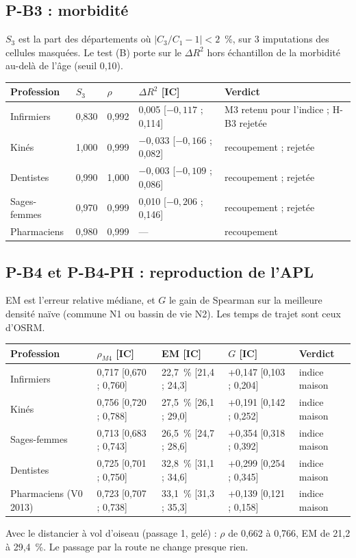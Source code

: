 \documentclass[11pt]{article}
\begin{document}
\subsection{P-B3 : morbidité}
$S_3$ est la part des départements où $|C_3/C_1-1|<2$~\%, sur 3 imputations des cellules masquées. Le test (B) porte
sur le $\Delta R^2$ hors échantillon de la morbidité au-delà de l'âge (seuil 0,10).
\begin{center}\footnotesize
\begin{tabular}{@{}lllll@{}}
\toprule
Profession & $S_3$ & $\rho$ & $\Delta R^2$ [IC] & Verdict \\
\midrule
Infirmiers & 0,830 & 0,992 & 0,005 [$-0{,}117$ ; 0,114] & M3 retenu pour l'indice ; H-B3 rejetée \\
Kinés & 1,000 & 0,999 & $-0{,}033$ [$-0{,}166$ ; 0,082] & recoupement ; rejetée \\
Dentistes & 0,990 & 1,000 & $-0{,}003$ [$-0{,}109$ ; 0,086] & recoupement ; rejetée \\
Sages-femmes & 0,970 & 0,999 & 0,010 [$-0{,}206$ ; 0,146] & recoupement ; rejetée \\
Pharmaciens & 0,980 & 0,999 & --- & recoupement \\
\bottomrule
\end{tabular}
\end{center}

\subsection{P-B4 et P-B4-PH : reproduction de l'APL}
EM est l'erreur relative médiane, et $G$ le gain de Spearman sur la meilleure densité naïve (commune N1 ou bassin de
vie N2). Les temps de trajet sont ceux d'OSRM.
\begin{center}\footnotesize
\begin{tabular}{@{}lllll@{}}
\toprule
Profession & $\rho_{M4}$ [IC] & EM [IC] & $G$ [IC] & Verdict \\
\midrule
Infirmiers & 0,717 [0,670 ; 0,760] & 22,7~\% [21,4 ; 24,3] & +0,147 [0,103 ; 0,204] & indice maison \\
Kinés & 0,756 [0,720 ; 0,788] & 27,5~\% [26,1 ; 29,0] & +0,191 [0,142 ; 0,252] & indice maison \\
Sages-femmes & 0,713 [0,683 ; 0,743] & 26,5~\% [24,7 ; 28,6] & +0,354 [0,318 ; 0,392] & indice maison \\
Dentistes & 0,725 [0,701 ; 0,750] & 32,8~\% [31,1 ; 34,6] & +0,299 [0,254 ; 0,345] & indice maison \\
Pharmaciens (V0 2013) & 0,723 [0,707 ; 0,738] & 33,1~\% [31,3 ; 35,3] & +0,139 [0,121 ; 0,158] & indice maison \\
\bottomrule
\end{tabular}
\end{center}
Avec le distancier à vol d'oiseau (passage 1, gelé) : $\rho$ de 0,662 à 0,766, EM de 21,2 à 29,4~\%. Le passage par la
route ne change presque rien.
\end{document}
